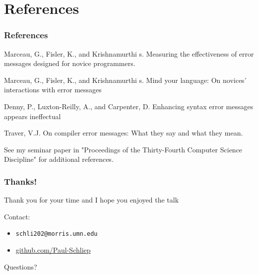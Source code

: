 \documentclass{beamer}
\newcommand{\linespace}{\vskip 0.25cm}
\begin{document}
\section*{References}

\begin{frame} 
	\frametitle{References} 
	
	\begin{thebibliography}{lskdjf}
	
Marceau, G., Fisler, K., and Krishnamurthi s.
\newblock Measuring the effectiveness of error messages designed for novice programmers.

Marceau, G., Fisler, K., and Krishnamurthi s.
\newblock Mind your language: On novices' interactions with error messages

Denny, P., Luxton-Reilly, A., and Carpenter, D.
\newblock Enhancing syntax error messages appears ineffectual
	
	Traver, V.J.
\newblock On compiler error messages: What they say and what they mean.
  
  	\end{thebibliography}
	
	\linespace
	\begin{center}
	See my seminar paper in "Proceedings of the Thirty-Fourth Computer Science Discipline" for additional references.
	\end{center}
\end{frame} 

\begin{frame}
	\frametitle{Thanks!}
	
	Thank you for your time and I hope you enjoyed the talk
		
	\linespace
	\linespace
	
	Contact:  
	\begin{itemize}
		\item \texttt{schli202@morris.umn.edu}
		\item \url{github.com/Paul-Schliep}
	\end{itemize}
	
	\linespace
	\linespace
	
	\begin{center}
	{\huge Questions?}
	\end{center}
\end{frame}
\end{document}
